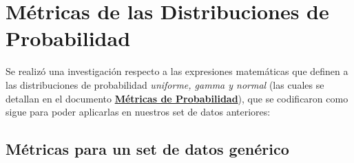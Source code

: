 \documentclass[11pt]{article} %
\begin{document}
	 \section{Métricas de las Distribuciones de Probabilidad}
	 Se realizó una investigación respecto a las expresiones matemáticas que definen a las distribuciones de probabilidad \textit{uniforme, gamma y normal} (las cuales se detallan en el documento \href{https://drive.google.com/file/d/1NWN1bE0bM\_MSOIqLIhVPP\_wj7d1f1rp6/view?usp=drive\_link}{\textbf{Métricas de Probabilidad}}), que se codificaron como sigue para poder aplicarlas en nuestros set de datos anteriores:
	 
	 \subsection{Métricas para un set de datos genérico}
\end{document}
